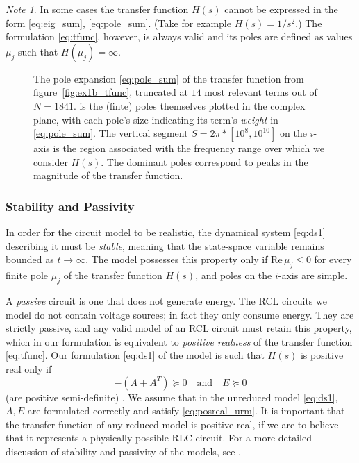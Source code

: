 \documentclass[letterpaper]{article}
\newcommand{\putfig}[3][{560 420}]{\texttt{[image: figs/\#3]}} %
\theoremstyle{remark}
\newtheorem*{note}{Note}
\begin{document}
\begin{description}
\begin{note}
 In some cases the transfer function $H(s)$ cannot
 be expressed in the form \eqref{eq:eig_sum},
 \eqref{eq:pole_sum}. (Take for
 example $H(s)=1/s^2$.)  The formulation \eqref{eq:tfunc}, however, is always 
 valid and its poles are defined as values $\mu_j$ such that $H(\mu_j)=\infty$. 
 \end{note}


\begin{figure}[htbp]
\centering
\subfloat[\label{tfunc_1bpoles}]{\putfig{0.48}{ex1b_tfunc_14poles.png}} \hfill
\subfloat[\label{1b_poles}]{\putfig{0.48}{ex1b_14poles.png}} 			
\caption{ The pole expansion \eqref{eq:pole_sum} of the 
transfer
function from figure~\ref{fig:ex1b_tfunc}, truncated at $14$ most relevant terms 
out of $N=1841$.
 is the (finte) poles themselves plotted in the 
complex plane,  with 
each pole's size indicating its term's \emph{weight} in \eqref{eq:pole_sum}.
The vertical segment 
$S= 2\pi*[10^8, 10^{10}]$ on the $i$-axis is the region associated with the 
frequency
range over which we consider $H(s)$. The dominant poles correspond to peaks in 
the magnitude of the transfer function.}
 \end{figure}

\subsubsection{Stability and Passivity}
In order for the circuit model to be realistic, the dynamical system \eqref{eq:ds1}
describing it must be \emph{stable}, meaning that the state-space variable remains
bounded as $t\rightarrow \infty$.  The model possesses this property only if 
$\mathrm{Re}\, \mu_j \leq 0$ for every finite pole $\mu_j$ of the transfer function 
$H(s)$, and poles on the $i$-axis are simple.

A \emph{passive} circuit is one that does not generate energy.  The RCL circuits we
model do not contain voltage sources; in fact they only consume energy. 
They are strictly passive, and any valid model of an RCL circuit must retain this
property, which in our formulation is equivalent to \emph{positive realness} of the
transfer function \eqref{eq:tfunc}. Our formulation \eqref{eq:ds1} of the model  is
such that $H(s)$ is positive real only if 
\begin{equation}
	-(A+A^T)\succeq 0 \quad\textrm{and}\quad E\succeq 0
\label{eq:posreal_urm}
\end{equation}
(are positive semi-definite) \cite[Theorem 4.5]{AN}.  We assume that in the
unreduced 
model \eqref{eq:ds1},
$A,E$ are formulated correctly
and satisfy \eqref{eq:posreal_urm}. It is important that the transfer function 
of any reduced model is positive real, if we are to believe that it represents 
a physically possible RLC circuit. For a more detailed discussion of stability and 
passivity of 
the models, see \cite[Sec. 4]{AN}. 




\end{description}
\end{document}
